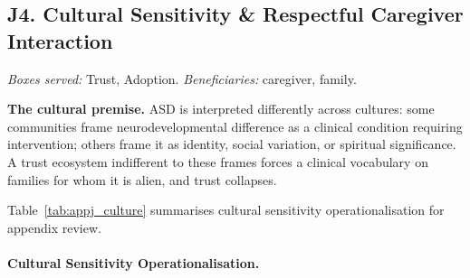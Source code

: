 \subsection*{J4. Cultural Sensitivity \& Respectful Caregiver Interaction}
\label{sec:appj_culture}

\noindent\emph{Boxes served:} Trust, Adoption. \emph{Beneficiaries:} caregiver, family.

\noindent\textbf{The cultural premise.} ASD is interpreted differently across cultures: some communities frame neurodevelopmental difference as a clinical condition requiring intervention; others frame it as identity, social variation, or spiritual significance. A trust ecosystem indifferent to these frames forces a clinical vocabulary on families for whom it is alien, and trust collapses.

\noindent Table~\ref{tab:appj_culture} summarises cultural sensitivity operationalisation for appendix review.

\paragraph{Cultural Sensitivity Operationalisation.}




